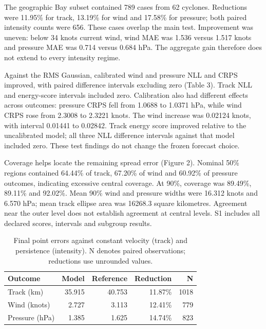 \documentclass[pdflatex,sn-mathphys-num,referee,a4paper]{sn-jnl}
\begin{document}
The geographic Bay subset contained 789 cases from 62 cyclones. Reductions were 11.95\% for track, 13.19\% for wind and 17.58\% for pressure; both paired intensity counts were 656. These cases overlap the main test. Improvement was uneven: below 34 knots current wind, wind MAE was 1.536 versus 1.517 knots and pressure MAE was 0.714 versus 0.684 hPa. The aggregate gain therefore does not extend to every intensity regime.

Against the RMS Gaussian, calibrated wind and pressure NLL and CRPS improved, with paired difference intervals excluding zero (Table 3). Track NLL and energy-score intervals included zero. Calibration also had different effects across outcomes: pressure CRPS fell from 1.0688 to 1.0371 hPa, while wind CRPS rose from 2.3008 to 2.3221 knots. The wind increase was 0.02124 knots, with interval 0.01441 to 0.02842. Track energy score improved relative to the uncalibrated model; all three NLL difference intervals against that model included zero. These test findings do not change the frozen forecast choice.

Coverage helps locate the remaining spread error (Figure 2). Nominal 50\% regions contained 64.44\% of track, 67.20\% of wind and 60.92\% of pressure outcomes, indicating excessive central coverage. At 90\%, coverage was 89.49\%, 89.11\% and 92.02\%. Mean 90\% wind and pressure widths were 16.312 knots and 6.570 hPa; mean track ellipse area was 16268.3 square kilometres. Agreement near the outer level does not establish agreement at central levels. S1 includes all declared scores, intervals and subgroup results.


\begin{table}[htbp]
\caption{Final point errors against constant velocity (track) and persistence (intensity). N denotes paired observations; reductions use unrounded values.}\label{tab:result2}
\centering
\begin{tabular}{lrrrr}
\toprule
Outcome & Model & Reference & Reduction & N \\
\midrule
Track (km) & 35.915 & 40.753 & 11.87\% & 1018 \\
Wind (knots) & 2.727 & 3.113 & 12.41\% & 779 \\
Pressure (hPa) & 1.385 & 1.625 & 14.74\% & 823 \\
\bottomrule
\end{tabular}
\end{table}
\end{document}
